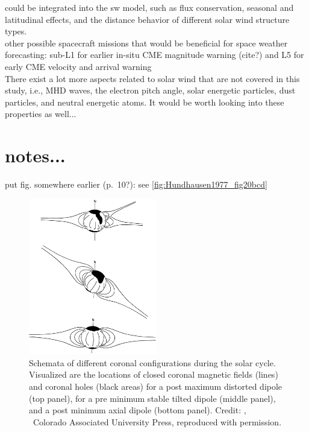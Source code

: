 could be integrated into the sw model, such as flux conservation, seasonal and latitudinal effects, and the distance behavior of different solar wind structure types.\\

other possible spacecraft missions that would be beneficial for space weather forecasting: sub-L1 for earlier in-situ CME magnitude warning (cite?) and L5 for early CME velocity and arrival warning \citep{Vourlidas2015}\\

There exist a lot more aspects related to solar wind that are not covered in this study, i.e., MHD waves, the electron pitch angle, solar energetic particles, dust particles, and neutral energetic atoms. It would be worth looking into these properties as well...\\




\section{notes...}

put fig. somewhere earlier (p.~10?): see \autoref{fig:Hundhausen1977_fig20bcd}\\
\begin{figure}[htb]
	\centering
	\includegraphics[width=0.5\textwidth]{figures_of_others/images/Hundhausen1977_fig20bcd.png}
	\caption[Credit: {\citep[Fig.~20, panels (b--d)]{Hundhausen1977}}, \textcopyright~Colorado Associated University Press, reproduced with permission.]
	{Schemata of different coronal configurations during the solar cycle. Visualized are the locations of closed coronal magnetic fields (lines) and coronal holes (black areas) for a post maximum distorted dipole (top panel), for a pre minimum stable tilted dipole (middle panel), and a post minimum axial dipole (bottom panel). Credit: {\citep[Fig.~20, panels (b--d)]{Hundhausen1977}}, \textcopyright~Colorado Associated University Press, reproduced with permission.}
	\label{fig:Hundhausen1977_fig20bcd}
\end{figure}

